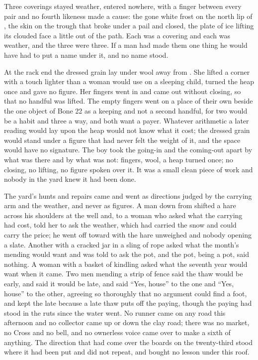 Three coverings stayed weather, entered nowhere, with a finger between every pair and no fourth likeness made a cause: the gone white frost on the north lip of , the skin on the trough that broke under a pail and closed, the plate of ice lifting its clouded face a little out of the path. Each was a covering and each was weather, and the three were three. If a man had made them one thing he would have had to put a name under it, and no name stood.

At the rack end the dressed grain lay under wool away from . She lifted a corner with a touch lighter than a woman would use on a sleeping child, turned the heap once and gave no figure. Her fingers went in and came out without closing, so that no handful was lifted. The empty fingers went on a place of their own beside the one object of Bone 22 as a keeping and not a second handful, for two would be a habit and three a way, and both want a payer. Whatever arithmetic a later reading would lay upon the heap would not know what it cost; the dressed grain would stand under a figure that had never felt the weight of it, and the space would have no signature. The boy took the going-in and the coming-out apart by what was there and by what was not: fingers, wool, a heap turned once; no closing, no lifting, no figure spoken over it. It was a small clean piece of work and nobody in the yard knew it had been done.

The yard’s hunts and repairs came and went as directions judged by the carrying arm and the weather, and never as figures. A man down from  shifted a hare across his shoulders at the well and, to a woman who asked what the carrying had cost, told her to ask the weather, which had carried the snow and could carry the price; he went off toward  with the hare unweighed and nobody opening a slate. Another with a cracked jar in a sling of rope asked what the month’s mending would want and was told to ask the pot, and the pot, being a pot, said nothing. A woman with a basket of kindling asked what the seventh year would want when it came. Two men mending a strip of fence said the thaw would be early, and said it would be late, and  said “Yes, house” to the one and “Yes, house” to the other, agreeing so thoroughly that no argument could find a foot, and kept the late because a late thaw puts off the paying, though the paying had stood in the ruts since the water went. No runner came on any road this afternoon and no collector came up or down the clay road; there was no market, no Cross and no bell, and no ownerless voice came over  to make a sixth of anything. The direction that had come over the boards on the twenty-third stood where it had been put and did not repeat, and bought no lesson under this roof.

